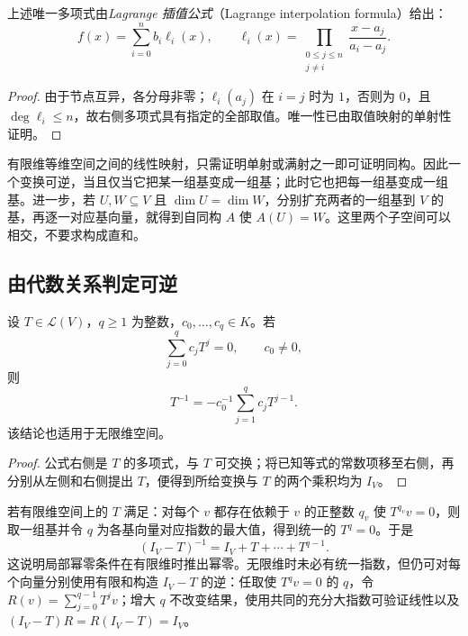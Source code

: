\begin{theorem}
\label{thm:xie-ex-lagrange-interpolation}
上述唯一多项式由\emph{Lagrange 插值公式}（Lagrange interpolation formula）给出：
\begin{equation}
\label{eq:xie-ex-lagrange-interpolation}
    f(x)=\sum_{i=0}^{n}b_i\ell_i(x),\qquad
    \ell_i(x)=\prod_{\substack{0\leq j\leq n\\j\ne i}}
    \frac{x-a_j}{a_i-a_j}.
\end{equation}
\end{theorem}

\begin{proof}
由于节点互异，各分母非零；$\ell_i(a_j)$ 在 $i=j$ 时为 $1$，否则为 $0$，且 $\deg\ell_i\leq n$，故右侧多项式具有指定的全部取值。唯一性已由取值映射的单射性证明。
\end{proof}

有限维等维空间之间的线性映射，只需证明单射或满射之一即可证明同构。因此一个变换可逆，当且仅当它把某一组基变成一组基；此时它也把每一组基变成一组基。进一步，若 $U,W\subseteq V$ 且 $\dim U=\dim W$，分别扩充两者的一组基到 $V$ 的基，再逐一对应基向量，就得到自同构 $A$ 使 $A(U)=W$。这里两个子空间可以相交，不要求构成直和。

\subsection{由代数关系判定可逆}

\begin{proposition}
\label{prop:xie-ex-polynomial-inverse}
设 $T\in\mathcal L(V)$，$q\geq1$ 为整数，$c_0,\ldots,c_q\in K$。若
\[
    \sum_{j=0}^{q}c_jT^j=0,\qquad c_0\ne0,
\]
则
\[
    T^{-1}=-c_0^{-1}\sum_{j=1}^{q}c_jT^{j-1}.
\]
该结论也适用于无限维空间。
\end{proposition}

\begin{proof}
公式右侧是 $T$ 的多项式，与 $T$ 可交换；将已知等式的常数项移至右侧，再分别从左侧和右侧提出 $T$，便得到所给变换与 $T$ 的两个乘积均为 $I_V$。
\end{proof}

若有限维空间上的 $T$ 满足：对每个 $v$ 都存在依赖于 $v$ 的正整数 $q_v$ 使 $T^{q_v}v=0$，则取一组基并令 $q$ 为各基向量对应指数的最大值，得到统一的 $T^q=0$。于是
\begin{equation}
\label{eq:xie-ex-nilpotent-geometric-series}
    (I_V-T)^{-1}=I_V+T+\cdots+T^{q-1}.
\end{equation}
这说明局部幂零条件在有限维时推出幂零。无限维时未必有统一指数，但仍可对每个向量分别使用有限和构造 $I_V-T$ 的逆：任取使 $T^qv=0$ 的 $q$，令 $R(v)=\sum_{j=0}^{q-1}T^jv$；增大 $q$ 不改变结果，使用共同的充分大指数可验证线性以及 $(I_V-T)R=R(I_V-T)=I_V$。

